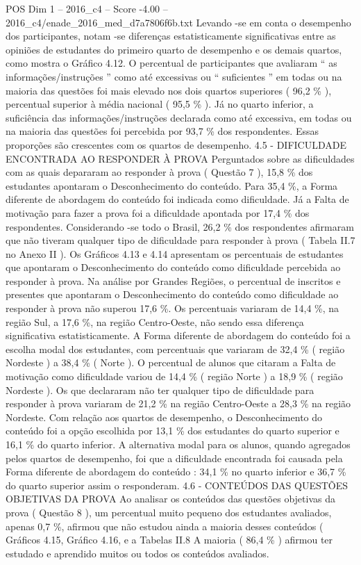 \begin{textsample}{POS Dim 1 – 2016\_c4 – Score -4.00 – 2016\_c4/enade\_2016\_med\_d7a7806f6b.txt}
Levando -se em conta o desempenho dos participantes, notam -se diferenças estatisticamente significativas entre as opiniões de estudantes do primeiro quarto de desempenho e os demais quartos, como mostra o Gráfico 4.12.
O percentual de participantes que avaliaram “ as informações/instruções ” como até excessivas ou “ suficientes ” em todas ou na maioria das questões foi mais elevado nos dois quartos superiores ( 96,2 \% ), percentual superior à média nacional ( 95,5 \% ).
Já no quarto inferior, a suficiência das informações/instruções declarada como até excessiva, em todas ou na maioria das questões foi percebida por 93,7 \% dos respondentes.
Essas proporções são crescentes com os quartos de desempenho. 4.5 - DIFICULDADE ENCONTRADA AO RESPONDER À PROVA Perguntados sobre as dificuldades com as quais depararam ao responder à prova ( Questão 7 ), 15,8 \% dos estudantes apontaram o Desconhecimento do conteúdo.
Para 35,4 \%, a Forma diferente de abordagem do conteúdo foi indicada como dificuldade.
Já a Falta de motivação para fazer a prova foi a dificuldade apontada por 17,4 \% dos respondentes.
Considerando -se todo o Brasil, 26,2 \% dos respondentes afirmaram que não tiveram qualquer tipo de dificuldade para responder à prova ( Tabela II.7 no Anexo II ).
Os Gráficos 4.13 e 4.14 apresentam os percentuais de estudantes que apontaram o Desconhecimento do conteúdo como dificuldade percebida ao responder à prova.
Na análise por Grandes Regiões, o percentual de inscritos e presentes que apontaram o Desconhecimento do conteúdo como dificuldade ao responder à prova não superou 17,6 \%.
Os percentuais variaram de 14,4 \%, na região Sul, a 17,6 \%, na região Centro-Oeste, não sendo essa diferença significativa estatisticamente.
A Forma diferente de abordagem do conteúdo foi a escolha modal dos estudantes, com percentuais que variaram de 32,4 \% ( região Nordeste ) a 38,4 \% ( Norte ).
O percentual de alunos que citaram a Falta de motivação como dificuldade variou de 14,4 \% ( região Norte ) a 18,9 \% ( região Nordeste ).
Os que declararam não ter qualquer tipo de dificuldade para responder à prova variaram de 21,2 \% na região Centro-Oeste a 28,3 \% na região Nordeste.
Com relação aos quartos de desempenho, o Desconhecimento do conteúdo foi a opção escolhida por 13,1 \% dos estudantes do quarto superior e 16,1 \% do quarto inferior.
A alternativa modal para os alunos, quando agregados pelos quartos de desempenho, foi que a dificuldade encontrada foi causada pela Forma diferente de abordagem do conteúdo : 34,1 \% no quarto inferior e 36,7 \% do quarto superior assim o responderam. 4.6 - CONTEÚDOS DAS QUESTÕES OBJETIVAS DA PROVA Ao analisar os conteúdos das questões objetivas da prova ( Questão 8 ), um percentual muito pequeno dos estudantes avaliados, apenas 0,7 \%, afirmou que não estudou ainda a maioria desses conteúdos ( Gráficos 4.15, Gráfico 4.16, e a Tabelas II.8 A maioria ( 86,4 \% ) afirmou ter estudado e aprendido muitos ou todos os conteúdos avaliados.

\end{textsample}
